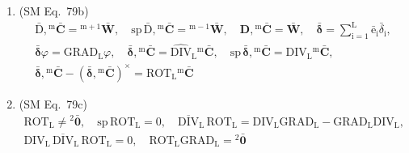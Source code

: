 \documentclass[12pt]{article}
\begin{document}
\begin{enumerate}[label=(\arabic*), series=formellist]
    \item (SM Eq.\ 79b) 
    \[
    \begin{gathered}
    \bar{\mathrm{D}}, {}^\mathrm{m}\bar{\mathbf{C}} = {}^{\mathrm{m}+1}\bar{\mathbf{W}}, \quad \mathrm{sp}\,\bar{\mathrm{D}}, {}^\mathrm{m}\bar{\mathbf{C}} = {}^{\mathrm{m}-1}\bar{\mathbf{W}}, \quad \mathbf{D}, {}^\mathrm{m}\bar{\mathbf{C}} = \bar{\mathbf{W}}, \quad \bar{\bm{\delta}} = \sum_{\mathrm{i}=1}^\mathrm{L} \bar{\mathrm{e}}_\mathrm{i} \bar{\delta}_\mathrm{i}, \\
    \bar{\bm{\delta}}\varphi = \mathrm{GRAD}_\mathrm{L} \varphi, \quad \bar{\bm{\delta}}, {}^\mathrm{m}\bar{\mathbf{C}} = \widehat{\mathrm{DIV}}_\mathrm{L} {}^\mathrm{m}\bar{\mathbf{C}}, \quad \mathrm{sp}\,\bar{\bm{\delta}}, {}^\mathrm{m}\bar{\mathbf{C}} = \mathrm{DIV}_\mathrm{L} {}^\mathrm{m}\bar{\mathbf{C}}, \\
    \bar{\bm{\delta}}, {}^\mathrm{m}\bar{\mathbf{C}} - (\bar{\bm{\delta}}, {}^\mathrm{m}\bar{\mathbf{C}})^\times = \mathrm{ROT}_\mathrm{L} {}^\mathrm{m}\bar{\mathbf{C}}
    \end{gathered}
    \]

    \item (SM Eq.\ 79c) 
    \[
    \begin{gathered}
    \mathrm{ROT}_\mathrm{L} \ne {}^2\bar{\mathbf{0}}, \quad \mathrm{sp}\,\mathrm{ROT}_\mathrm{L} = 0, \quad \overline{\mathrm{DIV}}_\mathrm{L}\, \mathrm{ROT}_\mathrm{L} = \mathrm{DIV}_\mathrm{L} \mathrm{GRAD}_\mathrm{L} - \mathrm{GRAD}_\mathrm{L} \mathrm{DIV}_\mathrm{L}, \\
    \mathrm{DIV}_\mathrm{L}\, \overline{\mathrm{DIV}}_\mathrm{L}\, \mathrm{ROT}_\mathrm{L} = 0, \quad \mathrm{ROT}_\mathrm{L} \mathrm{GRAD}_\mathrm{L} = {}^2\bar{\mathbf{0}}
    \end{gathered}
    \]


\end{enumerate}
\end{document}
